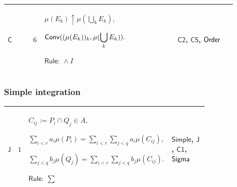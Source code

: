 \documentclass[12pt,reqno]{amsart}
\theoremstyle{blueplain}
\numberwithin{equation}{section}
\newlength{\DCTOneColumnBody}
\begin{document}
{\scriptsize \setlength{\parskip}{0pt}\nointerlineskip
\noindent 
\begin{tabular}{|@{}>{\centering\arraybackslash}m{0.10658\linewidth}|>{\centering\arraybackslash}m{0.03553\linewidth}|>{\centering\arraybackslash}m{0.52105\linewidth}|>{\centering\arraybackslash}m{0.23684\linewidth}|}
\hline
\hypertarget{proof:C6}{$\displaystyle \mathsf{C}$} & $\displaystyle 6$ & $%
\displaystyle \mu(E_k)\uparrow\mu(\bigcup_kE_k),$\par$\displaystyle \mathsf{%
Conv}((\mu(E_k))_k,\mu(\bigcup_kE_k)).$\par$\displaystyle \mathsf{Rule}:\
\land I$ & \hyperlink{proof:C2}{$\displaystyle \mathsf{C2}$}, \hyperlink{proof:C5}%
{$\displaystyle \mathsf{C5}$}, \hyperlink{lem:Order}{$\displaystyle \mathsf{%
Order}$} \\ \hline
\end{tabular}%
}

\subsubsection{\protect\scriptsize Simple integration}

{\scriptsize \setlength{\parskip}{0pt}\nointerlineskip
\noindent 
\begin{tabular}{|@{}>{\centering\arraybackslash}m{\DCTOneColumnBody}|}
\hline
$\displaystyle \mathsf{Context\_J}:=$\par$\displaystyle s,t:\mathsf{S}_A,$%
\par$\displaystyle \mathsf{Rep}(s;r,a,P),\quad\mathsf{Rep}(t;q,b,Q).$ \\ 
\hline
\end{tabular}%
}

{\scriptsize \setlength{\parskip}{0pt}\nointerlineskip
\noindent 
\begin{tabular}{|@{}>{\centering\arraybackslash}m{0.10658\linewidth}|>{\centering\arraybackslash}m{0.03553\linewidth}|>{\centering\arraybackslash}m{0.52105\linewidth}|>{\centering\arraybackslash}m{0.23684\linewidth}|}
\hline
\hypertarget{proof:J1}{$\displaystyle \mathsf{J}$} & $\displaystyle 1$ & $%
\displaystyle C_{ij}:=P_i\cap Q_j\in A,$\par$\displaystyle %
\sum_{i<r}a_i\mu(P_i)=\sum_{i<r}\sum_{j<q}a_i\mu(C_{ij}),$\par$\displaystyle %
\sum_{j<q}b_j\mu(Q_j)=\sum_{i<r}\sum_{j<q}b_j\mu(C_{ij}).$\par$\displaystyle 
\mathsf{Rule}:\ \sum$ & \hyperlink{def:Simple}{$\displaystyle \mathsf{Simple}
$}, \hyperlink{def:J}{$\displaystyle \mathsf{J}$}, \hyperlink{proof:C1}{$%
\displaystyle \mathsf{C1}$}, \hyperlink{ax:Sigma}{$\displaystyle \mathsf{%
Sigma}$} \\ \hline
\end{tabular}%
}
\end{document}
